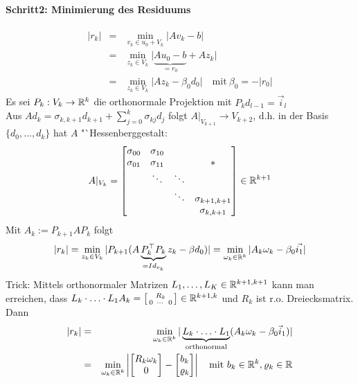 \documentclass{scrartcl}
\begin{document}
\paragraph*{Schritt2: Minimierung des Residuums}
\begin{eqnarray*}
\vert r_k \vert & = & \min\limits_{v_k \in u_0 + V_k} \vert A v_k - b \vert \\
& = & \min\limits_{z_k \in V_k} \vert \underbrace{Au_0 - b }_{=r_0} + A z_k \vert \\
& = & \min\limits_{z_k \in V_k} \vert A z_k - \beta_0 d_0 \vert \quad \mathrm{mit \ } \beta_0 = - \vert r_0 \vert
\end{eqnarray*}
Es sei $P_k: V_k \rightarrow \mathbb{R}^k$ die orthonormale Projektion mit $P_k d_{l-1} = \vec i_l$ \\
Aus $A d_k = \sigma_{k,k+1} d_{k+1} + \sum\limits_{j=0}^k \sigma_{kj} d_j$ folgt $A \vert_{V_{k+1}} \rightarrow V_{k+2}$, d.h. in der Basis $\{ d_0, \ldots, d_k \}$ hat $A$ "`Hessenberggestalt:
$$A \vert_{V_k} = \left[ 
\begin{matrix}
\sigma_{00} & \sigma_{10} \\
\sigma_{01} & \sigma_{11} & & * \\
& \ddots & \ddots \\
& & \ddots & \sigma_{k+1,k+1} \\
& & & \sigma_{k, k+1} 
\end{matrix}
\right]  \in \mathbb{R}^{k+1}$$
Mit $A_k := P_{k+1} A P_k$ folgt 
$$ \vert r_k \vert = \min\limits_{z_k \in V_k} \vert P_{k+1} (A \underbrace{P_k^\top P_k}_{=Id_{v_k}} z_k - \beta d_0 ) \vert = \min\limits_{\omega_k \in \mathbb{R}^k} \vert A_k \omega_k - \beta_0 \vec{i_1} \vert$$
Trick: Mittels orthonormaler Matrizen $L_1, \ldots,  L_K \in \mathbb{R}^{k+1,k+1}$ kann man erreichen, dass $L_k \cdot \ldots \cdot L_1 A_k = \left[ \begin{smallmatrix} & R_k \\ 0 & \cdots & 0 \end{smallmatrix} \right] \in \mathbb{R}^{k+1,k}$ und $R_k$ ist r.o. Dreiecksmatrix. Dann 
\begin{eqnarray*}
\vert r_k \vert & = & \min\limits_{\omega_k \in \mathbb{R}^k} \vert \underbrace{ L_k \cdot \ldots \cdot L_1}_\mathrm{orthonormal} (A_k \omega_k - \beta_0 \vec i_1 ) \vert \\
& = & \min\limits_{\omega_k \in \mathbb{R}^k} \left\vert \left[ \begin{matrix} R_k \omega_k \\ 0 \end{matrix} \right] - \left[ \begin{matrix} b_k \\ \varrho_k \end{matrix} \right] \right\vert \quad \mathrm{mit \ } b_k \in \mathbb{R}^k, \varrho_k \in \mathbb{R}
\end{eqnarray*}
\end{document}
